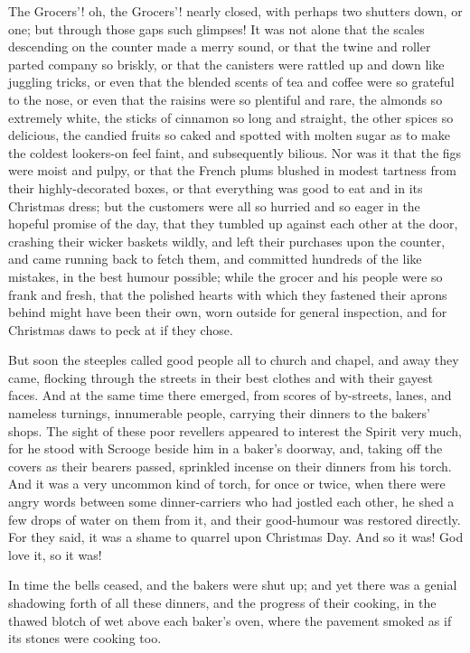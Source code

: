 The Grocers'! oh, the Grocers'! nearly closed, with perhaps two shutters
down, or one; but through those gaps such glimpses! It was not alone
that the scales descending on the counter made a merry sound, or that
the twine and roller parted company so briskly, or that the canisters
were rattled up and down like juggling tricks, or even that the blended
scents of tea and coffee were so grateful to the nose, or even that the
raisins were so plentiful and rare, the almonds so extremely white, the
sticks of cinnamon so long and straight, the other spices so delicious,
the candied fruits so caked and spotted with molten sugar as to make the
coldest lookers-on feel faint, and subsequently bilious. Nor was it that
the figs were moist and pulpy, or that the French plums blushed in
modest tartness from their highly-decorated boxes, or that everything
was good to eat and in its Christmas dress; but the customers were all
so hurried and so eager in the hopeful promise of the day, that they
tumbled up against each other at the door, crashing their wicker baskets
wildly, and left their purchases upon the counter, and came running
back to fetch them, and committed hundreds of the like mistakes, in the
best humour possible; while the grocer and his people were so frank and
fresh, that the polished hearts with which they fastened their aprons
behind might have been their own, worn outside for general inspection,
and for Christmas daws to peck at if they chose.

But soon the steeples called good people all to church and chapel, and
away they came, flocking through the streets in their best clothes and
with their gayest faces. And at the same time there emerged, from scores
of by-streets, lanes, and nameless turnings, innumerable people,
carrying their dinners to the bakers' shops. The sight of these poor
revellers appeared to interest the Spirit very much, for he stood with
Scrooge beside him in a baker's doorway, and, taking off the covers as
their bearers passed, sprinkled incense on their dinners from his torch.
And it was a very uncommon kind of torch, for once or twice, when there
were angry words between some dinner-carriers who had jostled each
other, he shed a few drops of water on them from it, and their
good-humour was restored directly. For they said, it was a shame to
quarrel upon Christmas Day. And so it was! God love it, so it was!

In time the bells ceased, and the bakers were shut up; and yet there was
a genial shadowing forth of all these dinners, and the progress of their
cooking, in the thawed blotch of wet above each baker's oven, where the
pavement smoked as if its stones were cooking too.

